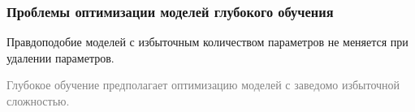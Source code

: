 \documentclass[usenames,dvipsnames,11pt,pdf,utf8,russian,aspectratio=169]{beamer}
\begin{document}
\begin{frame}                                                                                                                                   
\frametitle{Проблемы оптимизации моделей глубокого обучения}                                                                                                          
Правдоподобие моделей с избыточным количеством параметров не меняется при удалении параметров.                                                       
\begin{figure}[h]                                                                                                                               
\centering                                                                                                                                      
\end{figure}                                                                                                   
\textcolor{gray}{Глубокое обучение предполагает оптимизацию моделей с заведомо избыточной сложностью.}  
                                                                                                                                                
\end{frame}    
\end{document}

